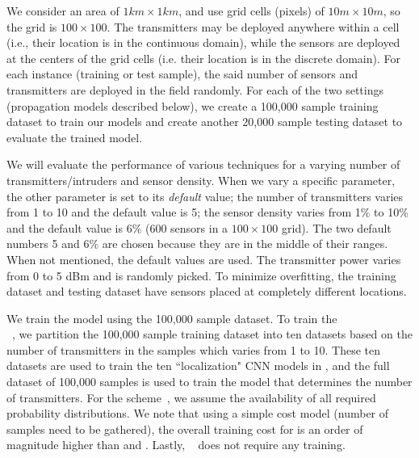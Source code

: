 We consider an area
of $1km \times 1km$, and use grid cells (pixels) of 
$10 m \times 10 m$, so the grid is $100\times100$. 
The transmitters may be deployed
anywhere within a cell (i.e., their location is in the continuous
domain), while the sensors are deployed at the centers of the grid cells (i.e. their location is in the discrete domain).
For each instance (training or test sample), the said number of sensors and transmitters are deployed in the field randomly. 
For each of the two settings (propagation models described below), we create a 100,000 sample training dataset 
to train our models and create another 20,000 sample testing dataset to evaluate the trained model. 

We will evaluate the performance of various techniques for
a varying number of transmitters/intruders and sensor
density. When we vary a specific parameter, the other parameter
is set to its \emph{default} value; the number of transmitters varies from 1 to 10 and 
the default value is 5; the sensor density varies from 1\% to 10\% and the default value is 6\% (600  sensors in a $100\times100$ grid).
The two default numbers 5 and 6\% are chosen because they are in the middle of their ranges.
When not mentioned, the default values are used.
The transmitter power varies from 0 to 5 dBm and is randomly picked.
To minimize overfitting, the training dataset and testing dataset have sensors placed at completely different locations.

We train the \our model using the 100,000 sample dataset. To train the \\
\deeptx~\cite{icccn20-deeptxfinder}, we partition the 100,000 sample training dataset into 
ten datasets based on the number of transmitters in the samples which varies from 1 to 10. 
These ten datasets are used to train the ten ``localization" CNN models in \deeptx, and the 
full dataset of 100,000 samples is used to train the \deeptx model that determines the number of transmitters. 
For the \map scheme~\cite{ipsn20-mtl}, we assume the availability of all required 
probability distributions. We note that using a simple cost model (number of samples need to be gathered), 
the overall training cost for \map is an order of magnitude higher than \our and \deeptx. 
Lastly, \splot~\cite{mobicom17-splot} does not require any training.




